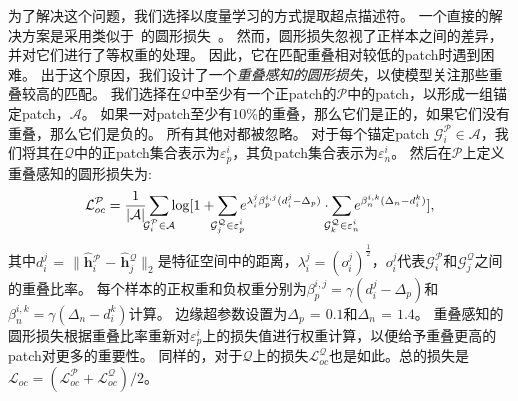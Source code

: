 为了解决这个问题，我们选择以度量学习的方式提取超点描述符。
一个直接的解决方案是采用类似于~\cite{bai2020d3feat,huang2021predator}的圆形损失~\cite{sun2020circle}。
然而，圆形损失忽视了正样本之间的差异，并对它们进行了等权重的处理。
因此，它在匹配重叠相对较低的patch时遇到困难。
出于这个原因，我们设计了一个\emph{重叠感知的圆形损失}，以使模型关注那些重叠较高的匹配。
我们选择在$\mathcal{Q}$中至少有一个正patch的$\mathcal{P}$中的patch，以形成一组锚定patch，$\mathcal{A}$。
如果一对patch至少有$10\%$的重叠，那么它们是正的，如果它们没有重叠，那么它们是负的。
所有其他对都被忽略。
对于每个锚定patch $\mathcal{G}^{\mathcal{P}}_i \in \mathcal{A}$，我们将其在$\mathcal{Q}$中的正patch集合表示为$\varepsilon^i_p$，其负patch集合表示为$\varepsilon^i_n$。
然后在$\mathcal{P}$上定义重叠感知的圆形损失为:
\begin{equation}
\label{eq:overlap-aware-circle-loss}
\mathcal{L}^{\mathcal{P}}_{oc} = \frac{1}{\lvert\mathcal{A}\rvert} \sum_{\mathclap{\mathcal{G}^{\mathcal{P}}_i \in \mathcal{A}}} \log[1 + \sum_{\mathclap{\mathcal{G}^{\mathcal{Q}}_j \in \varepsilon^i_p}} e^{\lambda^j_i\beta^{i,j}_p (d^j_i - \Delta_p)} \cdot \sum_{\mathclap{\mathcal{G}^{\mathcal{Q}}_k \in \varepsilon^i_n}} e^{\beta^{i,k}_n (\Delta_n - d^k_i)}],
\end{equation}
其中$d^j_i \hspace{1pt} {=} \hspace{1pt} \lVert \hat{\textbf{h}}{}^{\mathcal{P}}_i \hspace{1pt} {-} \hspace{1pt} \hat{\textbf{h}}{}^{\mathcal{Q}}_j \rVert_2$是特征空间中的距离，$\lambda_i^j = (o^j_i)^{\frac{1}{2}}$，$o^j_i$代表$\mathcal{G}^{\mathcal{P}}_i$和$\mathcal{G}^{\mathcal{Q}}_j$之间的重叠比率。
每个样本的正权重和负权重分别为$\beta^{i,j}_p = \gamma(d^j_i - \Delta_p)$和$\beta^{i,k}_n = \gamma(\Delta_n - d^k_i)$计算。
边缘超参数设置为$\Delta_p \hspace{1pt} {=} \hspace{1pt} 0.1$和$\Delta_n \hspace{1pt} {=} \hspace{1pt} 1.4$。
重叠感知的圆形损失根据重叠比率重新对$\varepsilon^i_p$上的损失值进行权重计算，以便给予重叠更高的patch对更多的重要性。
同样的，对于$\mathcal{Q}$上的损失$\mathcal{L}^{\mathcal{Q}}_{oc}$也是如此。总的损失是$\mathcal{L}_{oc} = (\mathcal{L}^{\mathcal{P}}_{oc} + \mathcal{L}^{\mathcal{Q}}_{oc}) / 2$。

